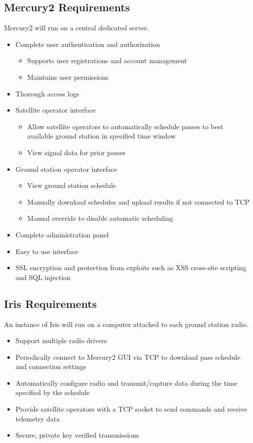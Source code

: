 \documentclass{mxl-note}
\begin{document}
\subsection{Mercury2 Requirements}
Mercury2 will run on a central dedicated server.
\begin{itemize}
	\item Complete user authentication and authorization
		\begin{itemize}
			\item Supports user registrations and account management
			\item Maintains user permissions
		\end{itemize}
	\item Thorough access logs
	\item Satellite operator interface
		\begin{itemize}
			\item Allow satellite operators to automatically schedule passes to best available ground station in specified time window
			\item View signal data for prior passes
		\end{itemize}
	\item Ground station operator interface
		\begin{itemize}
			\item View ground station schedule
			\item Manually download schedules and upload results if not connected to TCP
			\item Manual override to disable automatic scheduling
		\end{itemize}
	\item Complete administration panel
	\item Easy to use interface
	\item SSL encryption and protection from exploits such as XSS cross-site scripting and SQL injection 
\end{itemize}

\subsection{Iris Requirements}
An instance of Iris will run on a computer attached to each ground station radio.
\begin{itemize}
	\item Support multiple radio drivers
	\item Periodically connect to Mercury2 GUI via TCP to download pass schedule and connection settings
	\item Automatically configure radio and transmit/capture data during the time specified by the schedule
	\item Provide satellite operators with a TCP socket to send commands and receive telemetry data
	\item Secure, private key verified transmissions
\end{itemize}
\end{document}
